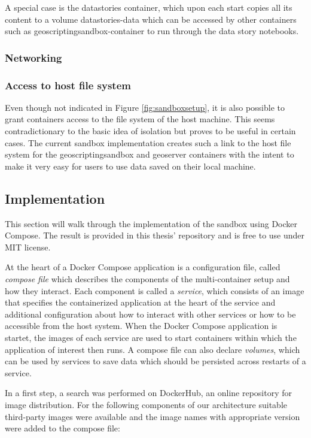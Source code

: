 \documentclass[11pt, a4paper, oneside, parskip=full-]{scrartcl}
\begin{document}
A special case is the datastories container, which upon each start copies all
its content to a volume datastories-data which can be accessed by other
containers such as geoscriptingsandbox-container to run through the data story
notebooks.

\subsubsection*{Networking}

\subsubsection*{Access to host file system}
Even though not indicated in Figure \ref{fig:sandboxsetup}, it is also possible
to grant containers access to the file system of the host machine. This seems
contradictionary to the basic idea of isolation but proves to be useful in
certain cases. The current sandbox implementation creates such a link to the
host file system for the geoscriptingsandbox and geoserver containers with the
intent to make it very easy for users to use data saved on their local machine.

\subsection{Implementation}

This section will walk through the implementation of the sandbox using Docker
Compose. The result is provided in this thesis'
repository\cite{osgeostacksandbox} and is free to use under MIT license.

At the heart of a Docker Compose application is a configuration file, called
\emph{compose file} which describes the components of the multi-container setup
and how they interact. Each component is called a \emph{service}, which consists
of an image that specifies the containerized application at the heart of the
service and additional configuration about how to interact with other services
or how to be accessible from the host system. When the Docker Compose
application is startet, the images of each service are used to start containers
within which the application of interest then runs. A compose file can also
declare \emph{volumes}, which can be used by services to save data which should
be persisted across restarts of a service.

In a first step, a search was performed on DockerHub\cite{dockerhub}, an online
repository for image distribution. For the following components of our
architecture suitable third-party images were available and the image names with
appropriate version were added to the compose file:
\end{document}
